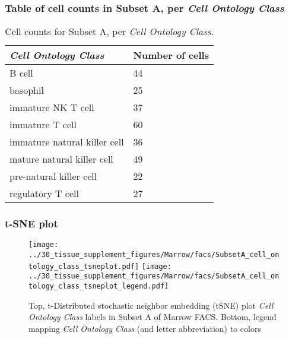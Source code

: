 \subsubsection{Table of cell counts in Subset A, per \emph{Cell Ontology Class}}\begin{table}[h]
\centering
\label{my-label}
\begin{tabular}{@{}ll@{}}
\toprule

\emph{Cell Ontology Class}& Number of cells \\ \midrule
B cell & 44 \\

basophil & 25 \\

immature NK T cell & 37 \\

immature T cell & 60 \\

immature natural killer cell & 36 \\

mature natural killer cell & 49 \\

pre-natural killer cell & 22 \\

regulatory T cell & 27 \\
\bottomrule
\end{tabular}
\caption{Cell counts for Subset A, per \emph{Cell Ontology Class}.}
\end{table}

\clearpage
\subsubsection{t-SNE plot}
\begin{figure}[h]
\centering
\texttt{[image: ../30\_tissue\_supplement\_figures/Marrow/facs/SubsetA\_cell\_ontology\_class\_tsneplot.pdf]}
\texttt{[image: ../30\_tissue\_supplement\_figures/Marrow/facs/SubsetA\_cell\_ontology\_class\_tsneplot\_legend.pdf]}
\caption{Top, t-Distributed stochastic neighbor embedding (tSNE) plot  \emph{Cell Ontology Class} labels in Subset A of Marrow FACS. Bottom, legend mapping \emph{Cell Ontology Class} (and letter abbreviation) to colors}
\end{figure}


\clearpage

